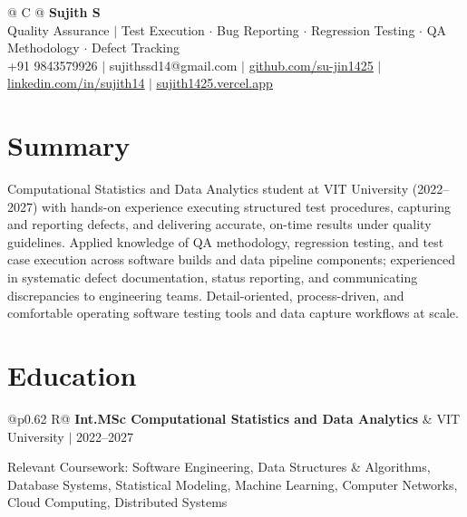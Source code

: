\documentclass[a4paper,10pt]{article}
\newcommand{\ulink}[2]{\href{#1}{\uline{#2}}}
\newcommand{\subheading}[1]{{\color[HTML]{0A0A0A}\fontsize{12}{14}\selectfont\bfseries #1}}
\newcommand{\meta}[1]{{\color[HTML]{5C5C5C}\fontsize{10.5}{12.5}\selectfont #1}}
\begin{document}
\pagestyle{empty}

\begin{tabularx}{\linewidth}{@{} C @{}}
{\color[HTML]{000000}\fontsize{30}{35}\selectfont\bfseries Sujith S} \\[5pt]
{\fontsize{10.5}{12.5}\selectfont\color[HTML]{3A3A3A}
Quality Assurance $|$ Test Execution $\cdot$ Bug Reporting $\cdot$ Regression Testing $\cdot$ QA Methodology $\cdot$ Defect Tracking} \\[6pt]
{\fontsize{10.5}{12.5}\selectfont\textcolor[HTML]{3A3A3A}{
+91 9843579926 $|$
sujithssd14@gmail.com $|$
\ulink{https://github.com/su-jin1425}{github.com/su-jin1425} $|$
\ulink{https://linkedin.com/in/sujith14}{linkedin.com/in/sujith14} $|$
\ulink{https://sujith1425.vercel.app}{sujith1425.vercel.app}}}
\end{tabularx}

\vspace{2pt}

\section{Summary}
\vspace{2pt}
{\color[HTML]{0A0A0A}\fontsize{11}{14}\selectfont
Computational Statistics and Data Analytics student at VIT University (2022--2027) with hands-on experience executing structured test procedures, capturing and reporting defects, and delivering accurate, on-time results under quality guidelines. Applied knowledge of QA methodology, regression testing, and test case execution across software builds and data pipeline components; experienced in systematic defect documentation, status reporting, and communicating discrepancies to engineering teams. Detail-oriented, process-driven, and comfortable operating software testing tools and data capture workflows at scale.}

\vspace{2pt}

\section{Education}
\vspace{2pt}

\begin{tabularx}{\linewidth}{@{}p{0.62\linewidth} R@{}}
\subheading{Int.MSc Computational Statistics and Data Analytics} & \meta{VIT University $|$ 2022--2027}
\end{tabularx}
\vspace{2pt}
{\color[HTML]{3A3A3A}\fontsize{11}{14}\selectfont Relevant Coursework: Software Engineering, Data Structures \& Algorithms, Database Systems, Statistical Modeling, Machine Learning, Computer Networks, Cloud Computing, Distributed Systems}
\end{document}
